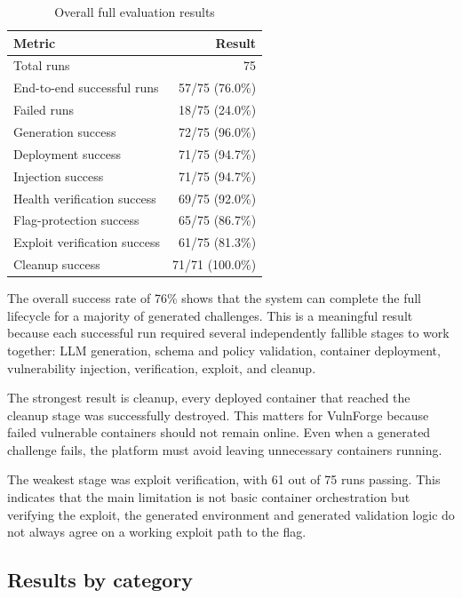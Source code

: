 \begin{table}[H]
	\centering
	\caption{Overall full evaluation results}
	\label{tab:overall-results}
	\begin{tabular}{|p{}|r|}
		\hline
		\textbf{Metric}              & \textbf{Result} \\
		\hline
		Total runs                   & 75              \\
		\hline
		End-to-end successful runs   & 57/75 (76.0\%)  \\
		\hline
		Failed runs                  & 18/75 (24.0\%)  \\
		\hline
		Generation success           & 72/75 (96.0\%)  \\
		\hline
		Deployment success           & 71/75 (94.7\%)  \\
		\hline
		Injection success            & 71/75 (94.7\%)  \\
		\hline
		Health verification success  & 69/75 (92.0\%)  \\
		\hline
		Flag-protection success      & 65/75 (86.7\%)  \\
		\hline
		Exploit verification success & 61/75 (81.3\%)  \\
		\hline
		Cleanup success              & 71/71 (100.0\%) \\
		\hline
	\end{tabular}
\end{table}

The overall success rate of 76\% shows that the system can complete the full lifecycle for a majority of generated challenges. This is a meaningful result because each successful run required several independently fallible stages to work together: LLM generation, schema and policy validation, container deployment, vulnerability injection, verification, exploit, and cleanup.

The strongest result is cleanup, every deployed container that reached the cleanup stage was successfully destroyed. This matters for VulnForge because failed vulnerable containers should not remain online. Even when a generated challenge fails, the platform must avoid leaving unnecessary containers running.

The weakest stage was exploit verification, with 61 out of 75 runs passing. This indicates that the main limitation is not basic container orchestration but verifying the exploit, the generated environment and generated validation logic do not always agree on a working exploit path to the flag.

\subsection{Results by category}\label{sec:results-by-category}

